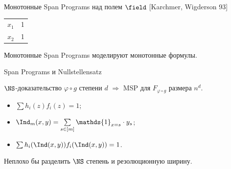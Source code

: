 \begin{frame}{Монотонные Span Programs над полем $\field$ [Karchmer, Wigderson 93]}
\begin{minipage}{0.5\linewidth}
\begin{center}
            \begin{tabular}{|c|c|}
                \hline
                $x_1$ & 1\\
                $x_2$ & 1\\
                \hline
            \end{tabular}
        \end{center}
    \end{minipage}

    \pause
    \begin{lemma}
        Монотонные Span Programs моделируют монотонные формулы.
    \end{lemma}
\end{frame}

\begin{frame}{Span Programs и Nullstellensatz}

    \begin{lemma}
        $\NS$-доказательство $\varphi \circ g$ степени $d$ $\Rightarrow$ MSP для $F_{\varphi \circ g}$
        размера $n^d$.
    \end{lemma}

    \pause
    \begin{itemize}
        \item $\sum h_i(z) f_i(z) = 1$;
        \item $\Ind_m(x, y) = \sum\limits_{s \in [m]} \mathds{1}_{x = s} \cdot y_s$;
        \item $\sum h_i(\Ind(x, y)) f_i(\Ind(x, y)) = 1$.
    \end{itemize}

    \pause
    \vspace{0.7cm}
    \begin{center}
        Неплохо бы разделить $\NS$ степень и резолюционную ширину.        
    \end{center}
\end{frame}

